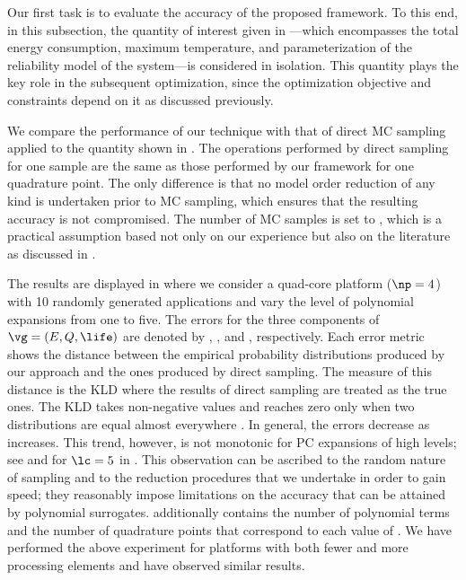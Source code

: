 Our first task is to evaluate the accuracy of the proposed framework. To this
end, in this subsection, the quantity of interest given in
---which encompasses the total energy
consumption, maximum temperature, and parameterization of the reliability model
of the system---is considered in isolation. This quantity plays the key role in
the subsequent optimization, since the optimization objective and constraints
depend on it as discussed previously.

We compare the performance of our technique with that of direct \ac{MC} sampling
applied to the quantity shown in . The
operations performed by direct sampling for one sample are the same as those
performed by our framework for one quadrature point. The only difference is that
no model order reduction of any kind is undertaken prior to \ac{MC} sampling,
which ensures that the resulting accuracy is not compromised. The number of
\ac{MC} samples is set to , which is a practical assumption based
not only on our experience but also on the literature as discussed in
.

The results are displayed in  where we
consider a quad-core platform ($\np = 4$) with 10 randomly generated
applications and vary the level of polynomial expansions \lc from one to five.
The errors for the three components of $\vg = (E, Q, \life)$ are denoted by
, , and \error{\life}, respectively. Each error metric shows
the distance between the empirical probability distributions produced by our
approach and the ones produced by direct sampling. The measure of this distance
is the \ac{KLD} \cite{gelman2013, hastie2013} where the results of direct
sampling are treated as the true ones. The \ac{KLD} takes non-negative values
and reaches zero only when two distributions are equal almost everywhere
\cite{durrett2010}. In general, the errors decrease as \lc increases. This
trend, however, is not monotonic for \ac{PC} expansions of high levels; see
 and \error{\life} for $\lc = 5$ in .
This observation can be ascribed to the random nature of sampling and to the
reduction procedures that we undertake in order to gain speed; they reasonably
impose limitations on the accuracy that can be attained by polynomial
surrogates.  additionally contains the number
of polynomial terms \nc and the number of quadrature points \nq that correspond
to each value of \lc. We have performed the above experiment for platforms with
both fewer and more processing elements and have observed similar results.

